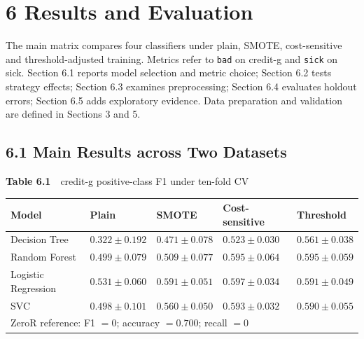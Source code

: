 \renewcommand{\theHfigure}{D.\arabic{figure}}\renewcommand{\theHtable}{D.\arabic{table}}
\setcounter{section}{5}\setcounter{subsection}{0}\label{sec:results}


\section*{6 Results and Evaluation}

The main matrix compares four classifiers under plain, SMOTE, cost-sensitive and
threshold-adjusted training. Metrics refer to \texttt{bad} on credit-g and
\texttt{sick} on sick. Section 6.1 reports model selection and metric choice;
Section 6.2 tests strategy effects; Section 6.3 examines preprocessing;
Section 6.4 evaluates holdout errors; Section 6.5 adds exploratory evidence.
Data preparation and validation are defined in Sections 3 and 5.

\subsection*{6.1 Main Results across Two Datasets}

\begin{center}
\begin{minipage}{\textwidth}
\centering
{\footnotesize\textbf{Table 6.1}\ \ credit-g positive-class F1 under ten-fold CV}

\footnotesize
\begin{tabular}{p{1.35in}p{0.95in}p{0.95in}p{0.95in}p{0.95in}}
\toprule
Model & Plain & SMOTE & Cost-sensitive & Threshold \\
\midrule
Decision Tree & $0.322 \pm 0.192$ & $0.471 \pm 0.078$ & $0.523 \pm 0.030$ & $0.561 \pm 0.038$ \\
Random Forest & $0.499 \pm 0.079$ & $0.509 \pm 0.077$ & $0.595 \pm 0.064$ & $0.595 \pm 0.059$ \\
Logistic Regression & $0.531 \pm 0.060$ & $0.591 \pm 0.051$ & $\mathbf{0.597 \pm 0.034}$ & $0.591 \pm 0.049$ \\
SVC & $0.498 \pm 0.101$ & $0.560 \pm 0.050$ & $0.593 \pm 0.032$ & $0.590 \pm 0.055$ \\
\midrule
\multicolumn{5}{l}{ZeroR reference: F1 $=0$; accuracy $=0.700$; recall $=0$} \\
\bottomrule
\end{tabular}
\end{minipage}
\end{center}

